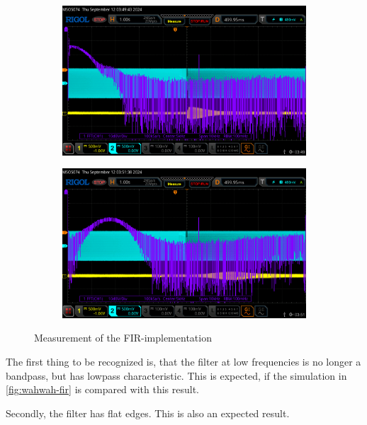\begin{figure}[!h]
    \centering
    \begin{subfigure}[c]{0.49\textwidth}
        \centering
        \includegraphics[width=\textwidth]{img/freq_lowest_fir.png}
    \end{subfigure}
    \begin{subfigure}[c]{0.49\textwidth}
        \centering
        \includegraphics[width=\textwidth]{img/freq_highest_fir.png}
    \end{subfigure}
    \caption{Measurement of the \ac{FIR}-implementation}
    \label{fig:measure-fir}
\end{figure}

The first thing to be recognized is, that the filter at low frequencies is no longer a bandpass, but has
lowpass characteristic. This is expected, if the simulation in \autoref{fig:wahwah-fir} is compared with this result.

Secondly, the filter has flat edges. This is also an expected result.

